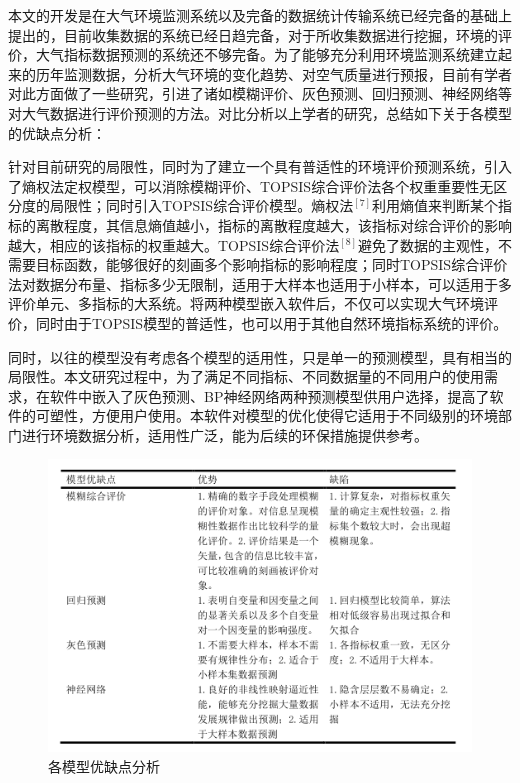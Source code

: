 \documentclass[UTF8]{ctexart}
\begin{document}
本文的开发是在大气环境监测系统以及完备的数据统计传输系统已经完备的基础上提出的，目前收集数据的系统已经日趋完备，对于所收集数据进行挖掘，环境的评价，大气指标数据预测的系统还不够完备。为了能够充分利用环境监测系统建立起来的历年监测数据，分析大气环境的变化趋势、对空气质量进行预报，目前有学者对此方面做了一些研究，引进了诸如模糊评价、灰色预测、回归预测、神经网络等对大气数据进行评价预测的方法。对比分析以上学者的研究，总结如下关于各模型的优缺点分析：

针对目前研究的局限性，同时为了建立一个具有普适性的环境评价预测系统，引入了熵权法定权模型，可以消除模糊评价、TOPSIS综合评价法各个权重重要性无区分度的局限性；同时引入TOPSIS综合评价模型。熵权法$^{[7]}$利用熵值来判断某个指标的离散程度，其信息熵值越小，指标的离散程度越大，该指标对综合评价的影响越大，相应的该指标的权重越大。TOPSIS综合评价法$^{[8]}$避免了数据的主观性，不需要目标函数，能够很好的刻画多个影响指标的影响程度；同时TOPSIS综合评价法对数据分布量、指标多少无限制，适用于大样本也适用于小样本，可以适用于多评价单元、多指标的大系统。将两种模型嵌入软件后，不仅可以实现大气环境评价，同时由于TOPSIS模型的普适性，也可以用于其他自然环境指标系统的评价。

同时，以往的模型没有考虑各个模型的适用性，只是单一的预测模型，具有相当的局限性。本文研究过程中，为了满足不同指标、不同数据量的不同用户的使用需求，在软件中嵌入了灰色预测、BP神经网络两种预测模型供用户选择，提高了软件的可塑性，方便用户使用。本软件对模型的优化使得它适用于不同级别的环境部门进行环境数据分析，适用性广泛，能为后续的环保措施提供参考。

\begin{figure}[H] %
    \centering %
    \includegraphics[width=1\textwidth]{./picture/youquedian.png} %
    \caption{各模型优缺点分析} 
\end{figure}
\end{document}
